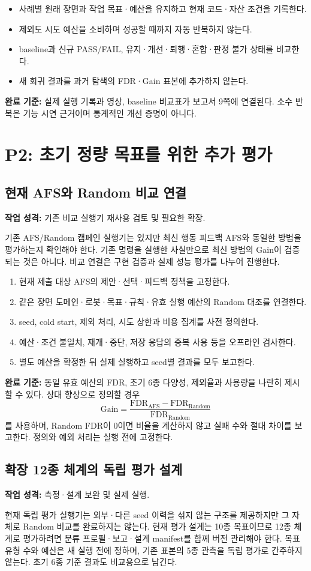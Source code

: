 \documentclass[a4paper,11pt]{article}
\newcommand{\task}[3]{\subsection{#1}\textbf{작업 성격:} #2\par #3}
\begin{document}
\begin{itemize}
\item 사례별 원래 장면과 작업 목표·예산을 유지하고 현재 코드·자산 조건을 기록한다.
\item 제외도 시도 예산을 소비하며 성공할 때까지 자동 반복하지 않는다.
\item baseline과 신규 PASS/FAIL, 유지·개선·퇴행·혼합·판정 불가 상태를 비교한다.
\item 새 회귀 결과를 과거 탐색의 FDR·Gain 표본에 추가하지 않는다.
\end{itemize}
\textbf{완료 기준:} 실제 실행 기록과 영상, baseline 비교표가 보고서 9쪽에 연결된다.
소수 반복은 기능 시연 근거이며 통계적인 개선 증명이 아니다.

\section{P2: 초기 정량 목표를 위한 추가 평가}
\task{현재 AFS와 Random 비교 연결}{기존 비교 실행기 재사용 검토 및 필요한 확장.}{
기존 AFS/Random 캠페인 실행기는 있지만 최신 행동 피드백 AFS와 동일한 방법을
평가하는지 확인해야 한다. 기존 명령을 실행한 사실만으로 최신 방법의 Gain이
검증되는 것은 아니다. 비교 연결은 구현 검증과 실제 성능 평가를 나누어 진행한다.}

\begin{enumerate}
\item 현재 제출 대상 AFS의 제안·선택·피드백 정책을 고정한다.
\item 같은 장면 도메인·로봇·목표·규칙·유효 실행 예산의 Random 대조를 연결한다.
\item seed, cold start, 제외 처리, 시도 상한과 비용 집계를 사전 정의한다.
\item 예산·조건 불일치, 재개·중단, 저장 응답의 중복 사용 등을 오프라인 검사한다.
\item 별도 예산을 확정한 뒤 실제 실행하고 seed별 결과를 모두 보고한다.
\end{enumerate}

\textbf{완료 기준:} 동일 유효 예산의 FDR, 초기 6종 다양성, 제외율과 사용량을
나란히 제시할 수 있다. 상대 향상으로 정의할 경우
\[
\mathrm{Gain}=\frac{\mathrm{FDR}_{\mathrm{AFS}}-\mathrm{FDR}_{\mathrm{Random}}}
{\mathrm{FDR}_{\mathrm{Random}}}
\]
를 사용하며, Random FDR이 0이면 비율을 계산하지 않고 실패 수와 절대 차이를
보고한다. 정의와 예외 처리는 실행 전에 고정한다.

\task{확장 12종 체계의 독립 평가 설계}{측정·설계 보완 및 실제 실행.}{
현재 독립 평가 실행기는 외부·다른 seed 이력을 섞지 않는 구조를 제공하지만
그 자체로 Random 비교를 완료하지는 않는다. 현재 평가 설계는 10종 목표이므로
12종 체계로 평가하려면 분류 프로필·보고·설계 manifest를 함께 버전 관리해야 한다.
목표 유형 수와 예산은 새 실행 전에 정하며, 기존 표본의 5종 관측을 독립 평가로
간주하지 않는다. 초기 6종 기준 결과도 비교용으로 남긴다.}
\end{document}
